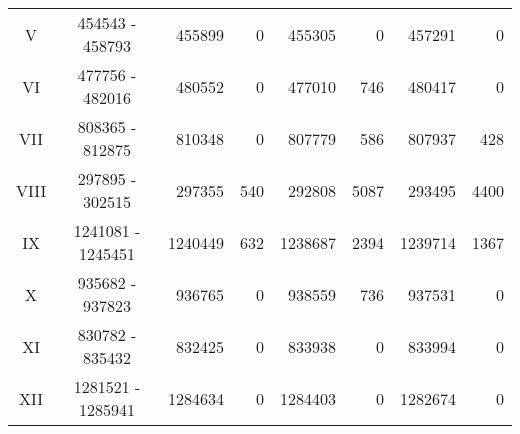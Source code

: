 \begin{table}[ht!]
\begin{center}
\begin{tabular}{c | c  r  r  r  r r r}
V & \num[group-separator={\,}]{454543} - \num[group-separator={\,}]{458793} & \num[group-separator={\,}]{455899} & \small{\num[group-separator={\,}]{0}}  & \num[group-separator={\,}]{455305} & \small{\num[group-separator={\,}]{0}}  & \num[group-separator={\,}]{457291} & \small{\num[group-separator={\,}]{0}}  \\
VI & \num[group-separator={\,}]{477756} - \num[group-separator={\,}]{482016} & \num[group-separator={\,}]{480552} & \small{\num[group-separator={\,}]{0}}  & \num[group-separator={\,}]{477010} & \small{\num[group-separator={\,}]{746}}  & \num[group-separator={\,}]{480417} & \small{\num[group-separator={\,}]{0}}  \\
VII & \num[group-separator={\,}]{808365} - \num[group-separator={\,}]{812875} & \num[group-separator={\,}]{810348} & \small{\num[group-separator={\,}]{0}}  & \num[group-separator={\,}]{807779} & \small{\num[group-separator={\,}]{586}}  & \num[group-separator={\,}]{807937} & \small{\num[group-separator={\,}]{428}}  \\
VIII & \num[group-separator={\,}]{297895} - \num[group-separator={\,}]{302515} & \num[group-separator={\,}]{297355} & \small{\num[group-separator={\,}]{540}}  & \num[group-separator={\,}]{292808} & \small{\num[group-separator={\,}]{5087}}  & \num[group-separator={\,}]{293495} & \small{\num[group-separator={\,}]{4400}}  \\
IX & \num[group-separator={\,}]{1241081} - \num[group-separator={\,}]{1245451} & \num[group-separator={\,}]{1240449} & \small{\num[group-separator={\,}]{632}}  & \num[group-separator={\,}]{1238687} & \small{\num[group-separator={\,}]{2394}}  & \num[group-separator={\,}]{1239714} & \small{\num[group-separator={\,}]{1367}}  \\
X & \num[group-separator={\,}]{935682} - \num[group-separator={\,}]{937823} & \num[group-separator={\,}]{936765} & \small{\num[group-separator={\,}]{0}}  & \num[group-separator={\,}]{938559} & \small{\num[group-separator={\,}]{736}}  & \num[group-separator={\,}]{937531} & \small{\num[group-separator={\,}]{0}}  \\
XI & \num[group-separator={\,}]{830782} - \num[group-separator={\,}]{835432} & \num[group-separator={\,}]{832425} & \small{\num[group-separator={\,}]{0}}  & \num[group-separator={\,}]{833938} & \small{\num[group-separator={\,}]{0}}  & \num[group-separator={\,}]{833994} & \small{\num[group-separator={\,}]{0}}  \\
XII & \num[group-separator={\,}]{1281521} - \num[group-separator={\,}]{1285941} & \num[group-separator={\,}]{1284634} & \small{\num[group-separator={\,}]{0}}  & \num[group-separator={\,}]{1284403} & \small{\num[group-separator={\,}]{0}}  & \num[group-separator={\,}]{1282674} & \small{\num[group-separator={\,}]{0}}  \\

\end{tabular}
\end{center}
\end{table}
